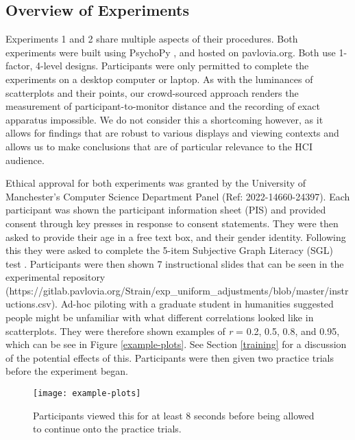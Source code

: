 \documentclass[preprint, 3p,
authoryear]{elsarticle} %
\begin{document}
\hypertarget{overview-of-experiments}{%
\subsection{Overview of Experiments}\label{overview-of-experiments}}

Experiments 1 and 2 share multiple aspects of their procedures. Both
experiments were built using PsychoPy \citep{pierce_psychopy_2019}, and
hosted on pavlovia.org. Both use 1-factor, 4-level designs. Participants
were only permitted to complete the experiments on a desktop computer or
laptop. As with the luminances of scatterplots and their points, our
crowd-sourced approach renders the measurement of participant-to-monitor
distance and the recording of exact apparatus impossible. We do not
consider this a shortcoming however, as it allows for findings that are
robust to various displays and viewing contexts and allows us to make
conclusions that are of particular relevance to the HCI audience.

Ethical approval for both experiments was granted by the University of
Manchester's Computer Science Department Panel (Ref: 2022-14660-24397).
Each participant was shown the participant information sheet (PIS) and
provided consent through key presses in response to consent statements.
They were then asked to provide their age in a free text box, and their
gender identity. Following this they were asked to complete the 5-item
Subjective Graph Literacy (SGL) test \citep{garcia_2016}. Participants
were then shown 7 instructional slides that can be seen in the
experimental repository
(https://gitlab.pavlovia.org/Strain/exp\_uniform\_adjustments/blob/master/instructions.csv).
Ad-hoc piloting with a graduate student in humanities suggested people
might be unfamiliar with what different correlations looked like in
scatterplots. They were therefore shown examples of \emph{r} = 0.2, 0.5,
0.8, and 0.95, which can be see in Figure \ref{example-plots}. See
Section \ref{training} for a discussion of the potential effects of
this. Participants were then given two practice trials before the
experiment began.

\begin{figure}

\texttt{[image: example-plots]} \hfill{}

\caption{\label{example-plots}Participants viewed this for at least 8 seconds before being allowed to continue onto the practice trials.}\label{fig:example-plots}
\end{figure}
\end{document}

